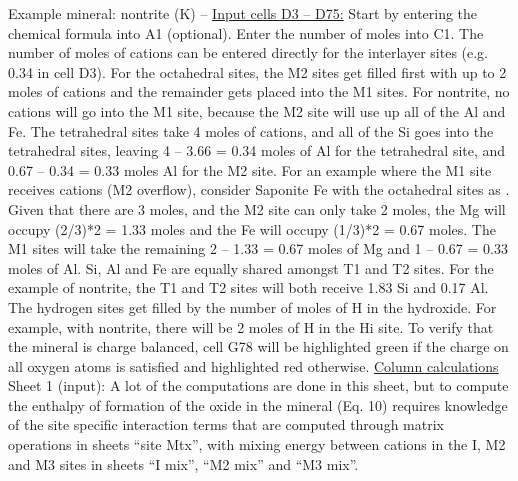\documentclass[12pt]{article} %
\numberwithin{equation}{section}
\numberwithin{table}{section}
\numberwithin{figure}{section}
\begin{document}
Example mineral: nontrite (K) – 
\newline
\newline
\noindent \underline{Input cells D3 – D75:}
\newline
\newline
\noindent Start by entering the chemical formula into A1 (optional). Enter the number of moles into C1. 
The number of moles of cations can be entered directly for the interlayer sites (e.g. 0.34 in cell D3). For the octahedral sites, the M2 sites get filled first with up to 2 moles of cations and the remainder gets placed into the M1 sites.  For nontrite, no cations will go into the M1 site, because the M2 site will use up all of the Al and Fe. The tetrahedral sites take 4 moles of cations, and all of the Si goes into the tetrahedral sites, leaving 4 – 3.66 = 0.34 moles of Al for the tetrahedral site, and 0.67 – 0.34 = 0.33 moles Al for the M2 site. For an example where the M1 site receives cations (M2 overflow), consider Saponite Fe with the octahedral sites as . Given that there are 3 moles, and the M2 site can only take 2 moles, the Mg will occupy (2/3)*2 = 1.33 moles and the Fe will occupy (1/3)*2 = 0.67 moles. The M1 sites will take the remaining 2 – 1.33  = 0.67 moles of Mg and 1 – 0.67 = 0.33 moles of Al.  Si, Al and Fe are equally shared amongst T1 and T2 sites. For the example of nontrite, the T1 and T2 sites will both receive 1.83 Si and 0.17 Al. 
The hydrogen sites get filled by the number of moles of H in the hydroxide. For example, with nontrite, there will be 2 moles of H in the Hi site. 
To verify that the mineral is charge balanced, cell G78 will be highlighted green if the charge on all oxygen atoms is satisfied and highlighted red otherwise. 
\newline
\newline
\noindent \underline{Column calculations}
\newline
\newline
\noindent Sheet 1 (input): A lot of the computations are done in this sheet, but to compute the enthalpy of formation of the oxide in the mineral (Eq. 10) requires knowledge of the site specific interaction terms that are computed through matrix operations in sheets “site Mtx”, with mixing energy between cations in the I, M2 and M3 sites in sheets “I mix”, “M2 mix” and “M3 mix”. 
\end{document}
